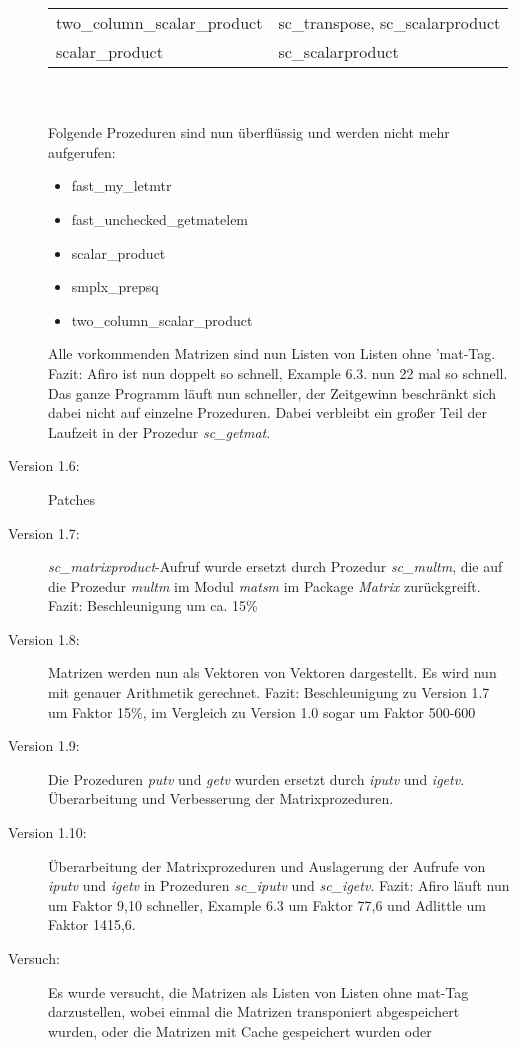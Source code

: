 \documentclass[a4paper]{article}
\begin{document}
\begin{description}
\begin{tabular}{ll}
	two\_column\_scalar\_product & sc\_transpose, sc\_scalarproduct \\
	scalar\_product & sc\_scalarproduct \\
	\end{tabular} \\
	\\
	Folgende Prozeduren sind nun überflüssig und werden nicht mehr
	aufgerufen: 
	\begin{itemize}
	\item fast\_my\_letmtr
	\item fast\_unchecked\_getmatelem 
	\item scalar\_product 
	\item smplx\_prepsq 
	\item two\_column\_scalar\_product 
	\end{itemize}
	Alle vorkommenden Matrizen sind nun Listen von Listen ohne 'mat-Tag.
	Fazit: Afiro ist nun doppelt so schnell, Example 6.3. nun 22 mal so 
	schnell. Das ganze Programm läuft nun schneller, der Zeitgewinn 
	beschränkt sich dabei nicht auf einzelne Prozeduren. Dabei verbleibt 
	ein großer Teil der Laufzeit in der Prozedur \textit{sc\_getmat}.
\item[Version 1.6:]
	Patches
\item[Version 1.7:]
	\textit{sc\_matrixproduct}-Aufruf wurde ersetzt durch Prozedur 
	\textit{sc\_multm}, die auf die Prozedur \textit{multm} im Modul 
	\textit{matsm} im Package \textit{Matrix} zurückgreift.
	Fazit: Beschleunigung um ca. 15\%
\item[Version 1.8:]
	Matrizen werden nun als Vektoren von Vektoren dargestellt. Es wird nun
	mit genauer Arithmetik gerechnet.
	Fazit: Beschleunigung zu Version 1.7 um Faktor 15\%, im Vergleich zu 
	Version 1.0 sogar um Faktor 500-600%
\item[Version 1.9:]
	Die Prozeduren \textit{putv} und \textit{getv} wurden ersetzt durch
	\textit{iputv} und \textit{igetv}. Überarbeitung und Verbesserung der 
	Matrixprozeduren. 
\item[Version 1.10:]
	Überarbeitung der Matrixprozeduren und Auslagerung der Aufrufe von 
	\textit{iputv} und \textit{igetv} in Prozeduren \textit{sc\_iputv} 
	und \textit{sc\_igetv}.
	Fazit: Afiro läuft nun um Faktor 9,10 schneller, Example 6.3 um Faktor
	77,6 und Adlittle um Faktor 1415,6.
\item[Versuch:]
	Es wurde versucht, die Matrizen als Listen von Listen ohne mat-Tag 
	darzustellen, wobei einmal die Matrizen transponiert abgespeichert 
	wurden, oder die Matrizen mit Cache gespeichert wurden oder 

\end{description}
\end{document}
